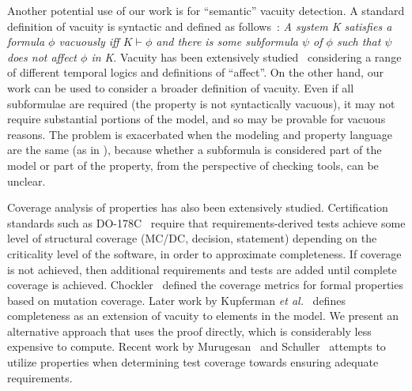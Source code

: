 Another potential use of our work is for ``semantic'' vacuity detection.  A standard definition of vacuity is syntactic and defined as follows~\cite{Kupferman:2006:SCF}: {\em A system K satisfies a formula $\phi$ vacuously iff $K \vdash \phi$ and there is some subformula $\psi$ of $\phi$ such that $\psi$ does not affect $\phi$ in K}.  Vacuity has been extensively studied~\cite{Gurfinkel:2012:RVB,Chockler2008,DBLP:Ben-DavidK13,Kupferman:2006:SCF,Chockler:2007,Beer1997} considering a range of different temporal logics and definitions of ``affect''.  On the other hand, our work can be used to consider a broader definition of vacuity.  Even if all subformulae are required (the property is not syntactically vacuous), it may not require substantial portions of the model, and so may be provable for vacuous reasons.  The problem is exacerbated when the modeling and property language are the same (as in \jkind), because whether a subformula is considered part of the model or part of the property, from the perspective of checking tools, can be unclear.

Coverage analysis of properties has also been extensively studied. Certification standards such as DO-178C~\cite{DO178C} require that requirements-derived tests achieve some level of structural coverage (MC/DC, decision, statement) depending on the criticality level of the software, in order to approximate completeness.  If coverage is not achieved, then additional requirements and tests are added until complete coverage is achieved.  Chockler~\cite{chockler_coverage_2003} defined the coverage metrics for formal properties based on mutation coverage.  Later work by Kupferman \textit{et al.}~\cite{Kupferman:2006:SCF} defines completeness as an extension of vacuity to elements in the model.  We present an alternative approach that uses the proof directly, which is considerably less expensive to compute.  Recent work by Murugesan~\cite{murugesan2015we} and Schuller~\cite{schuler_assessing_2011} attempts to utilize properties when determining test coverage towards ensuring adequate requirements.




\iffalse
\begin{itemize}
    \item MUS's : checked
    \item Work on Alloy: checked
    \item Work that Teme pointed us to : will be added
    \item Anything else Elaheh has found : \%60 checked
\end{itemize}
\fi

